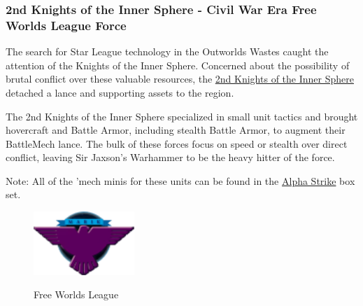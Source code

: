 \subsubsection{2nd Knights of the Inner Sphere - Civil War Era Free Worlds League Force}

The search for Star League technology in the Outworlds Wastes caught the attention of the Knights of the Inner Sphere.
Concerned about the possibility of brutal conflict over these valuable resources, the \href{https://www.sarna.net/wiki/2nd_Knights_of_the_Inner_Sphere}{2nd Knights of the Inner Sphere} detached a lance and supporting assets to the region.

The 2nd Knights of the Inner Sphere specialized in small unit tactics and brought hovercraft and Battle Armor, including stealth Battle Armor, to augment their BattleMech lance.
The bulk of these forces focus on speed or stealth over direct conflict, leaving Sir Jaxson's Warhammer to be the heavy hitter of the force.
          	
Note: All of the 'mech minis for these units can be found in the \href{https://www.sarna.net/wiki/Alpha_Strike_Boxed_Set}{Alpha Strike} box set. 

\begin{figure}[!h]
  \centering
  \includegraphics[alt='Free Worlds League Logo', width=1.5in, height=0.944in]{img/Free-Worlds-League.png}
  \caption*{Free Worlds League}
\end{figure}

